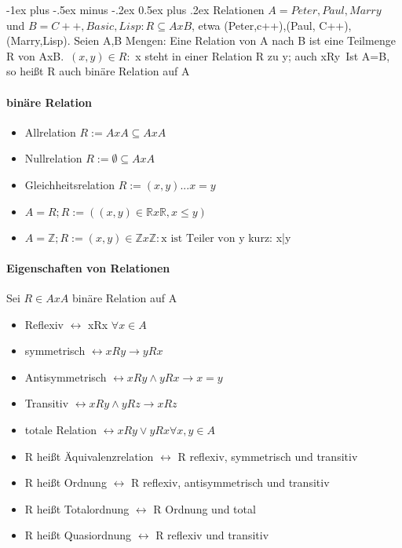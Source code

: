 \documentclass[10pt,landscape]{article}
\makeatletter
\renewcommand{\section}{\@startsection{section}{1}{0mm}%
                                {-1ex plus -.5ex minus -.2ex}%
                                {0.5ex plus .2ex}%
                                {\normalfont\large\bfseries}}
\makeatother
\begin{document}
\begin{multicols}{3}
\section{Relationen}
$A={Peter, Paul, Marry}$ und $B={C++, Basic, Lisp}: R\subseteq AxB$, etwa {(Peter,c++),(Paul, C++), (Marry,Lisp)}. Seien A,B Mengen: Eine Relation von A nach B ist eine Teilmenge R von AxB.\
$(x,y)\in R:$ x steht in einer Relation R zu y; auch xRy\
Ist A=B, so heißt R auch binäre Relation auf A

\paragraph{binäre Relation}
\begin{itemize}
    \item Allrelation $R:=AxA \subseteq AxA$
    \item Nullrelation $R:=\emptyset \subseteq AxA$
    \item Gleichheitsrelation $R:={(x,y)... x=y}$
    \item $A=R; R:=((x,y)\in \mathbb{R} x \mathbb{R}, x \leq y)$
    \item $A=\mathbb{Z}; R:={(x,y)\in \mathbb{Z} x \mathbb{Z}: \text{x ist Teiler von y} }$ kurz: x|y
\end{itemize}

\paragraph{Eigenschaften von Relationen}
Sei $R\in AxA$ binäre Relation auf A
\begin{itemize}
    \item Reflexiv $\leftrightarrow$ xRx $\forall x \in A$
    \item symmetrisch $\leftrightarrow xRy \rightarrow yRx$
    \item Antisymmetrisch $\leftrightarrow xRy \wedge yRx \rightarrow x=y$
    \item Transitiv $\leftrightarrow xRy \wedge yRz \rightarrow xRz$
    \item totale Relation $\leftrightarrow xRy \vee yRx  \forall x,y \in A$
\end{itemize}
\begin{itemize}
    \item R heißt Äquivalenzrelation $\leftrightarrow$ R reflexiv, symmetrisch und transitiv
    \item R heißt Ordnung $\leftrightarrow$ R reflexiv, antisymmetrisch und transitiv
    \item R heißt Totalordnung $\leftrightarrow$ R Ordnung und total
    \item R heißt Quasiordnung $\leftrightarrow$ R reflexiv und transitiv
\end{itemize}


\end{multicols}
\end{document}
